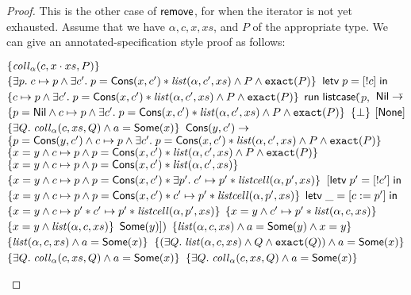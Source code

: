 \begin{proof}
This is the other case of $\mathsf{remove}$, for when the iterator is not
yet exhausted. Assume that we have $\alpha, c, x, xs$, and $P$ of the
appropriate type. We can give an annotated-specification style proof
as follows:

\begin{specification}
\nextline $\{{\mathit{coll}_\alpha(c, x\cdot xs, P)}\}$ 
\nextline $\{{\exists p.\; c \mapsto p \land \exists c'.\; p = \mathsf{Cons}(x, c') * \mathit{list}(\alpha, c', xs) \land P \land \mathtt{exact}({P})}\}$ 
\nextline $\mathsf{letv}\;p = [!c]\;\mathsf{in}\;$ 
\nextline $\{{c \mapsto p \land \exists c'.\; p = \mathsf{Cons}(x, c') * \mathit{list}(\alpha, c', xs) \land P \land \mathtt{exact}({P})}\}$ 
\nextline $\mathsf{run}\;\mathsf{listcase}($\=$p,$ 
\nextline \> $\mathsf{Nil} \to $\= $\{{p = \mathsf{Nil} \land c \mapsto p \land \exists c'.\; p = \mathsf{Cons}(x, c') * \mathit{list}(\alpha, c', xs) \land P \land \mathtt{exact}({P})}\}$ 
\nextline \> \> $\{{\bot}\}$
\nextline \> \> $[\mathsf{None}]$ 
\nextline \> \> $\{{\exists Q.\; \mathit{coll}_\alpha(c, xs, Q) \land a = \mathsf{Some}(x)}\}$
\nextline \> $\mathsf{Cons}(y, c') \to $ 
\nextline \> \> $\{{p = \mathsf{Cons}(y, c') \land c \mapsto p \land \exists c'.\; p = \mathsf{Cons}(x, c') * \mathit{list}(\alpha, c', xs) \land P \land \mathtt{exact}({P})}\}$ 
\nextline \> \> $\{{x = y \land c \mapsto p \land p = \mathsf{Cons}(x, c') * \mathit{list}(\alpha, c', xs) \land P \land \mathtt{exact}({P})}\}$ 
\nextline \> \> $\{{x = y \land c \mapsto p \land p = \mathsf{Cons}(x, c') * \mathit{list}(\alpha, c', xs)}\}$
\nextline \> \> $\{{x = y \land c \mapsto p \land p = \mathsf{Cons}(x, c') * \exists p'.\; c' \mapsto p' * \mathit{listcell}(\alpha, p', xs)}\}$
\nextline \> \> $[\mathsf{letv}\;p' = [!c']\;\mathsf{in}\;$ 
\nextline \> \> $\{{x = y \land c \mapsto p \land p = \mathsf{Cons}(x, c') * c' \mapsto p' * \mathit{listcell}(\alpha, p', xs)}\}$
\nextline \> \> $\mathsf{letv}\;\_ = [c := p']\;\mathsf{in}\;$ 
\nextline \> \> $\{{x = y \land c \mapsto p' * c' \mapsto p' * \mathit{listcell}(\alpha, p', xs)}\}$
\nextline \> \> $\{{x = y \land c' \mapsto p' * \mathit{list}(\alpha, c, xs)}\}$
\nextline \> \> $\{{x = y \land \mathit{list}(\alpha, c, xs)}\}$
\nextline \> \> $\mathsf{Some}(y)])$
\nextline \> \> $\{{\mathit{list}(\alpha, c, xs) \land a = \mathsf{Some}(y) \land x = y}\}$ 
\nextline \> \> $\{{\mathit{list}(\alpha,c, xs) \land a = \mathsf{Some}(x)}\}$
\nextline \> \> $\{{(\exists Q.\; \mathit{list}(\alpha,c, xs) \land Q \land \mathtt{exact}({Q})) \land a = \mathsf{Some}(x)}\}$
\nextline \> \> $\{{\exists Q.\; \mathit{coll}_\alpha(c, xs, Q) \land a = \mathsf{Some}(x)}\}$
\nextline $\{{\exists Q.\; \mathit{coll}_\alpha(c, xs, Q) \land a = \mathsf{Some}(x)}\}$
\end{specification}
\end{proof}

